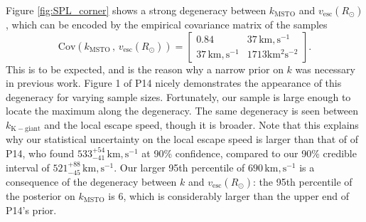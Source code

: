 \documentclass[useAMS,twocolumn,usenatbib]{mn2e}
\def\km,s{{\,\mathrm{km,s^{-1}}}}
\def\vesc{{v_\mathrm{esc}}}
\begin{document}
Figure \ref{fig:SPL_corner} shows a strong degeneracy between $k_\mathrm{MSTO}$ and $\vesc(R_\odot)$, which can be encoded by the empirical covariance matrix of the samples
%
\begin{equation}
\mathrm{Cov}\left(k_\mathrm{MSTO}\,,\,\vesc(R_\odot)\right) = \begin{bmatrix} 0.84 & 37\km,s \\ 37\km,s & 1713 \mathrm{km^2s^{-2}}\end{bmatrix}.
\end{equation}
%
This is to be expected, and is the reason why a narrow prior on $k$ was necessary in previous work. 
Figure 1 of P14 nicely demonstrates the appearance of this degeneracy for varying sample sizes. 
Fortunately, our sample is large enough to locate the maximum along the degeneracy. 
The same degeneracy is seen between $k_\mathrm{K-giant}$ and the local escape speed, though it is broader.
Note that this explains why our statistical uncertainty on the local escape speed is larger than that of of P14, who found $533^{+54}_{-41}\km,s$ at 90\% confidence, compared to our 90\% credible interval of $521^{+88}_{-45}\km,s$.
Our larger 95th percentile of $690\km,s$ is a consequence of the degeneracy between $k$ and $\vesc(R_\odot)$: the 95th percentile of the posterior on $k_\mathrm{MSTO}$ is 6, which is considerably larger than the upper end of P14's prior.
\end{document}
